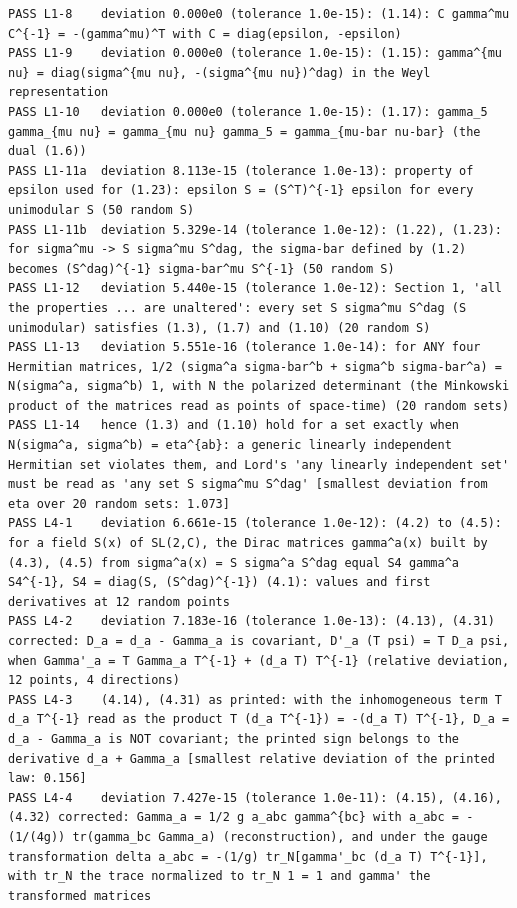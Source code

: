 \documentclass[
  10pt,
]{article}
\begin{document}
\begin{verbatim}
PASS L1-8    deviation 0.000e0 (tolerance 1.0e-15): (1.14): C gamma^mu C^{-1} = -(gamma^mu)^T with C = diag(epsilon, -epsilon)
PASS L1-9    deviation 0.000e0 (tolerance 1.0e-15): (1.15): gamma^{mu nu} = diag(sigma^{mu nu}, -(sigma^{mu nu})^dag) in the Weyl representation
PASS L1-10   deviation 0.000e0 (tolerance 1.0e-15): (1.17): gamma_5 gamma_{mu nu} = gamma_{mu nu} gamma_5 = gamma_{mu-bar nu-bar} (the dual (1.6))
PASS L1-11a  deviation 8.113e-15 (tolerance 1.0e-13): property of epsilon used for (1.23): epsilon S = (S^T)^{-1} epsilon for every unimodular S (50 random S)
PASS L1-11b  deviation 5.329e-14 (tolerance 1.0e-12): (1.22), (1.23): for sigma^mu -> S sigma^mu S^dag, the sigma-bar defined by (1.2) becomes (S^dag)^{-1} sigma-bar^mu S^{-1} (50 random S)
PASS L1-12   deviation 5.440e-15 (tolerance 1.0e-12): Section 1, 'all the properties ... are unaltered': every set S sigma^mu S^dag (S unimodular) satisfies (1.3), (1.7) and (1.10) (20 random S)
PASS L1-13   deviation 5.551e-16 (tolerance 1.0e-14): for ANY four Hermitian matrices, 1/2 (sigma^a sigma-bar^b + sigma^b sigma-bar^a) = N(sigma^a, sigma^b) 1, with N the polarized determinant (the Minkowski product of the matrices read as points of space-time) (20 random sets)
PASS L1-14   hence (1.3) and (1.10) hold for a set exactly when N(sigma^a, sigma^b) = eta^{ab}: a generic linearly independent Hermitian set violates them, and Lord's 'any linearly independent set' must be read as 'any set S sigma^mu S^dag' [smallest deviation from eta over 20 random sets: 1.073]
PASS L4-1    deviation 6.661e-15 (tolerance 1.0e-12): (4.2) to (4.5): for a field S(x) of SL(2,C), the Dirac matrices gamma^a(x) built by (4.3), (4.5) from sigma^a(x) = S sigma^a S^dag equal S4 gamma^a S4^{-1}, S4 = diag(S, (S^dag)^{-1}) (4.1): values and first derivatives at 12 random points
PASS L4-2    deviation 7.183e-16 (tolerance 1.0e-13): (4.13), (4.31) corrected: D_a = d_a - Gamma_a is covariant, D'_a (T psi) = T D_a psi, when Gamma'_a = T Gamma_a T^{-1} + (d_a T) T^{-1} (relative deviation, 12 points, 4 directions)
PASS L4-3    (4.14), (4.31) as printed: with the inhomogeneous term T d_a T^{-1} read as the product T (d_a T^{-1}) = -(d_a T) T^{-1}, D_a = d_a - Gamma_a is NOT covariant; the printed sign belongs to the derivative d_a + Gamma_a [smallest relative deviation of the printed law: 0.156]
PASS L4-4    deviation 7.427e-15 (tolerance 1.0e-11): (4.15), (4.16), (4.32) corrected: Gamma_a = 1/2 g a_abc gamma^{bc} with a_abc = -(1/(4g)) tr(gamma_bc Gamma_a) (reconstruction), and under the gauge transformation delta a_abc = -(1/g) tr_N[gamma'_bc (d_a T) T^{-1}], with tr_N the trace normalized to tr_N 1 = 1 and gamma' the transformed matrices

\end{verbatim}
\end{document}

